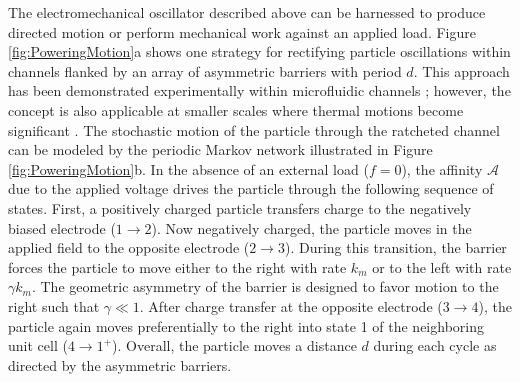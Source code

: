 \begin{appendices}
The electromechanical oscillator described above can be harnessed to produce directed motion or perform mechanical work against an applied load. Figure \ref{fig:PoweringMotion}a shows one strategy for rectifying particle oscillations within channels flanked by an array of asymmetric barriers with period $d$. This approach has been demonstrated experimentally within microfluidic channels \autocite{drews2013ratcheted}; however, the concept is also applicable at smaller scales where thermal motions become significant \autocite{kowalik2016ratcheted}. The stochastic motion of the particle through the ratcheted channel can be modeled by the periodic Markov network illustrated in Figure \ref{fig:PoweringMotion}b. In the absence of an external load ($f=0$), the affinity $\mathcal{A}$ due to the applied voltage drives the particle through the following sequence of states. First, a positively charged particle transfers charge to the negatively biased electrode ($1\rightarrow2$). Now negatively charged, the particle moves in the applied field to the opposite electrode ($2\rightarrow3$). During this transition, the barrier forces the particle to move either to the right with rate $k_m$ or to the left with rate $\gamma k_m$. The geometric asymmetry of the barrier is designed to favor motion to the right such that $\gamma \ll 1$. After charge transfer at the opposite electrode ($3\rightarrow 4$), the particle again moves preferentially to the right into state 1 of the neighboring unit cell ($4\rightarrow 1^+$). Overall, the particle moves a distance $d$ during each cycle as directed by the asymmetric barriers.


\end{appendices}
